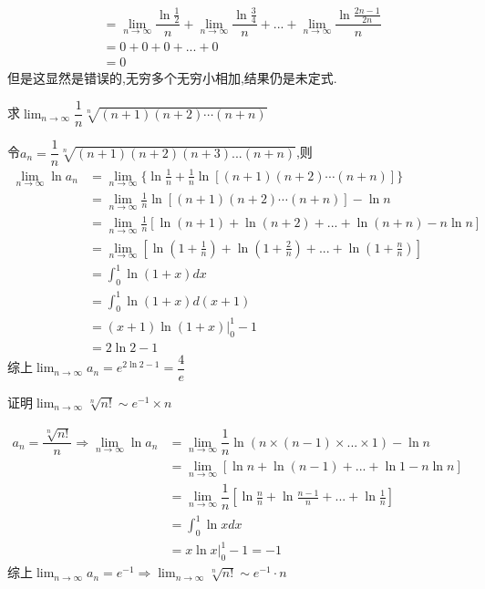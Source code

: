 \documentclass[8pt a4paper, oneside, UTF8]{ctexbook}
\begin{document}
\begin{sloppypar}
\begin{note}
\begin{align*}
            & = \lim_{n \to \infty}\dfrac{\ln \frac{1}{2}}{n}+\lim_{n \to \infty}\dfrac{\ln \frac{3}{4}}{n}+...+\lim_{n \to \infty}\dfrac{\ln \frac{2n-1}{2n}}{n}\\
            & = 0+0+0+...+0\\
            &=0
        \end{align*}
        但是这显然是错误的,无穷多个无穷小相加,结果仍是未定式.
    \end{note}
    \begin{problem}
        求$\lim_{n\to\infty}\dfrac{1}{n}\sqrt[n]{(n+1)(n+2)\cdots(n+n)}$
    \end{problem}
    \begin{solution}
        令$a_n=\dfrac{1}{n}\sqrt[n]{(n+1)(n+2)(n+3)...(n+n)}$,则
        \begin{align*}
            \lim_{n \to \infty}\ln a_n & = \lim_{n \to \infty} \{ \ln\frac{1}{n}+\frac{1}{n} \ln[(n+1)(n+2)\cdots(n+n)]\}\\
          & = \lim_{n\to \infty}\frac{1}{n} \ln[(n+1)(n+2)\cdots(n+n)]- \ln n\\
          & = \lim_{n \to \infty}\frac{1}{n}[\ln(n+1)+\ln(n+2)+...+\ln(n+n)-n\ln n]\\
          & = \lim_{n\to \infty}[\ln(1+\frac{1}{n})+\ln(1+\frac{2}{n})+...+\ln(1+\frac{n}{n})]\\
          & = \int_0^1 \ln(1+x)dx \\
          & = \int_0^1 \ln(1+x)d(x+1)\\
          & = (x+1)\ln(1+x)|_0^1 -1\\
          & = 2\ln2 -1
        \end{align*}
    综上$\lim_{n\to \infty}a_n=e^{2\ln2-1}=\dfrac{4}{e}$
    \end{solution}
    \begin{problem}
        证明$\lim_{n\to \infty}\sqrt[n]{n!}\sim e^{-1}\times n$
    \end{problem}
    \begin{solution}
        \begin{align*}
            a_n=\dfrac{\sqrt[n]{n!}}{n} \Rightarrow \lim_{n\to \infty}\ln a_n & =\lim_{n\to \infty}\dfrac{1}{n}\ln(n\times (n-1)\times ...\times 1)-\ln n    \\
            & =  \lim_{n \to \infty}[\ln n+\ln(n-1)+...+\ln 1-n\ln n]\\
            & = \lim_{n\to \infty}\dfrac{1}{n}[\ln\frac{n}{n}+\ln\frac{n-1}{n}+...+\ln \frac{1}{n}]\\
            & =\int _0 ^1 \ln x dx\\
            & = x \ln x|_0^1-1 = -1
        \end{align*}
    综上$\lim_{n \to \infty}a_n=e^{-1} \Rightarrow \lim_{n\to \infty}\sqrt[n]{n!}\sim e^{-1}\cdot n$
    \end{solution}

\end{sloppypar}
\end{document}
